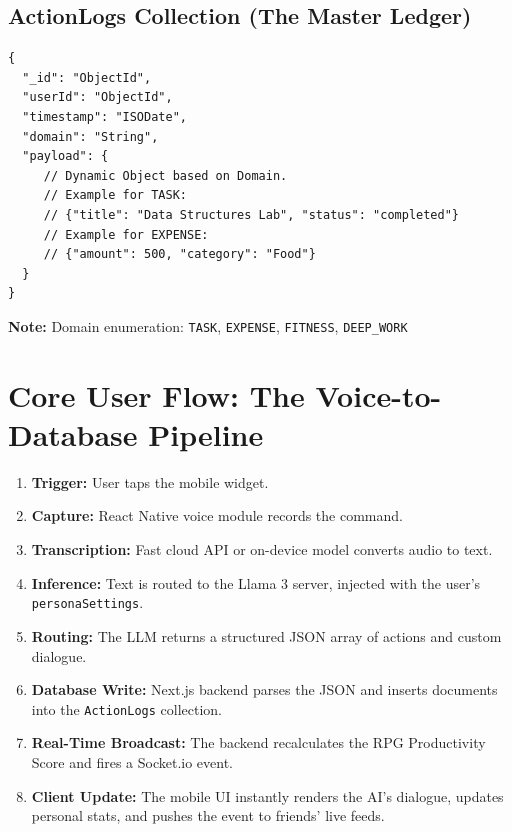 \documentclass[11pt,oneside]{article}
\begin{document}
\subsection*{ActionLogs Collection (The Master Ledger)}

\begin{lstlisting}
{
  "_id": "ObjectId",
  "userId": "ObjectId",
  "timestamp": "ISODate",
  "domain": "String",
  "payload": {
     // Dynamic Object based on Domain.
     // Example for TASK:
     // {"title": "Data Structures Lab", "status": "completed"}
     // Example for EXPENSE:
     // {"amount": 500, "category": "Food"}
  }
}
\end{lstlisting}

\noindent
\textbf{Note:} Domain enumeration: \texttt{TASK}, \texttt{EXPENSE}, \texttt{FITNESS}, \texttt{DEEP\_WORK}

\section{Core User Flow: The Voice-to-Database Pipeline}

\begin{enumerate}
  \item \textbf{Trigger:} User taps the mobile widget.
  
  \item \textbf{Capture:} React Native voice module records the command.
  
  \item \textbf{Transcription:} Fast cloud API or on-device model converts audio to text.
  
  \item \textbf{Inference:} Text is routed to the Llama 3 server, injected with the user's \texttt{personaSettings}.
  
  \item \textbf{Routing:} The LLM returns a structured JSON array of actions and custom dialogue.
  
  \item \textbf{Database Write:} Next.js backend parses the JSON and inserts documents into the \texttt{ActionLogs} collection.
  
  \item \textbf{Real-Time Broadcast:} The backend recalculates the RPG Productivity Score and fires a Socket.io event.
  
  \item \textbf{Client Update:} The mobile UI instantly renders the AI's dialogue, updates personal stats, and pushes the event to friends' live feeds.
\end{enumerate}
\end{document}

